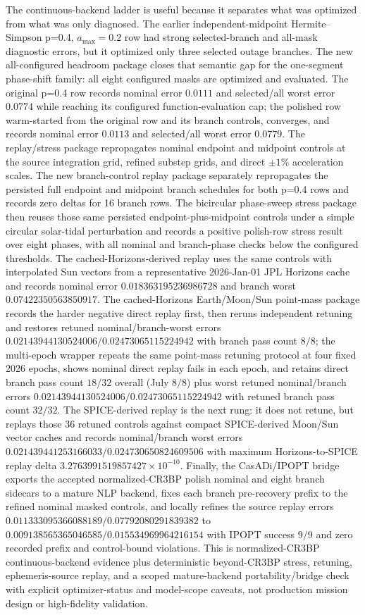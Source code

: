 \documentclass[preprint,12pt]{elsarticle}
\begin{document}
The continuous-backend ladder is useful because it separates what was optimized from what was only diagnosed. The earlier independent-midpoint Hermite--Simpson p=0.4, $a_{\max}=0.2$ row had strong selected-branch and all-mask diagnostic errors, but it optimized only three selected outage branches. The new all-configured headroom package closes that semantic gap for the one-segment phase-shift family: all eight configured masks are optimized and evaluated. The original p=0.4 row records nominal error $0.0111$ and selected/all worst error $0.0774$ while reaching its configured function-evaluation cap; the polished row warm-started from the original row and its branch controls, converges, and records nominal error $0.0113$ and selected/all worst error $0.0779$. The replay/stress package repropagates nominal endpoint and midpoint controls at the source integration grid, refined substep grids, and direct $\pm 1\%$ acceleration scales. The new branch-control replay package separately repropagates the persisted full endpoint and midpoint branch schedules for both p=0.4 rows and records zero deltas for 16 branch rows. The bicircular phase-sweep stress package then reuses those same persisted endpoint-plus-midpoint controls under a simple circular solar-tidal perturbation and records a positive polish-row stress result over eight phases, with all nominal and branch-phase checks below the configured thresholds. The cached-Horizons-derived replay uses the same controls with interpolated Sun vectors from a representative 2026-Jan-01 JPL Horizons cache and records nominal error $0.018363195236986728$ and branch worst $0.07422350563850917$. The cached-Horizons Earth/Moon/Sun point-mass package records the harder negative direct replay first, then reruns independent retuning and restores retuned nominal/branch-worst errors $0.02143944130524006/0.02473065115224942$ with branch pass count $8/8$; the multi-epoch wrapper repeats the same point-mass retuning protocol at four fixed 2026 epochs, shows nominal direct replay fails in each epoch, and retains direct branch pass count $18/32$ overall (July $8/8$) plus worst retuned nominal/branch errors $0.02143944130524006/0.02473065115224942$ with retuned branch pass count $32/32$. The SPICE-derived replay is the next rung: it does not retune, but replays those 36 retuned controls against compact SPICE-derived Moon/Sun vector caches and records nominal/branch worst errors $0.021439441253166033/0.024730650824609506$ with maximum Horizons-to-SPICE replay delta $3.2763991519857427\times10^{-10}$. Finally, the CasADi/IPOPT bridge exports the accepted normalized-CR3BP polish nominal and eight branch sidecars to a mature NLP backend, fixes each branch pre-recovery prefix to the refined nominal masked controls, and locally refines the source replay errors $0.011333095366088189/0.07792080291839382$ to $0.009138565365046585/0.015534969964216154$ with IPOPT success $9/9$ and zero recorded prefix and control-bound violations. This is normalized-CR3BP continuous-backend evidence plus deterministic beyond-CR3BP stress, retuning, ephemeris-source replay, and a scoped mature-backend portability/bridge check with explicit optimizer-status and model-scope caveats, not production mission design or high-fidelity validation.
\end{document}

